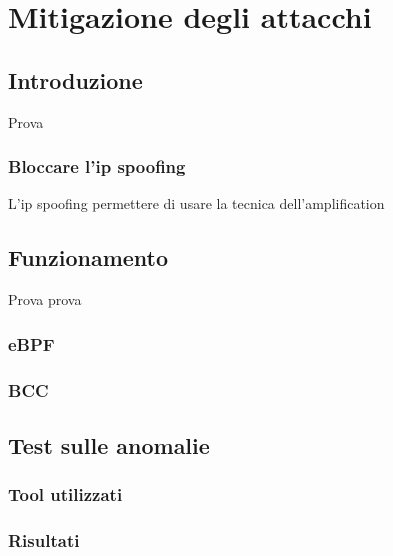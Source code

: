 \chapter{Mitigazione degli attacchi}


\section{Introduzione}
Prova 
\subsection{Bloccare l'ip spoofing}
L'ip spoofing permettere di usare la tecnica dell'amplification


\section{Funzionamento}
Prova prova
\subsection{eBPF}
\subsection{BCC}

\section{Test sulle anomalie}
\subsection{Tool utilizzati}
\subsection{Risultati}
